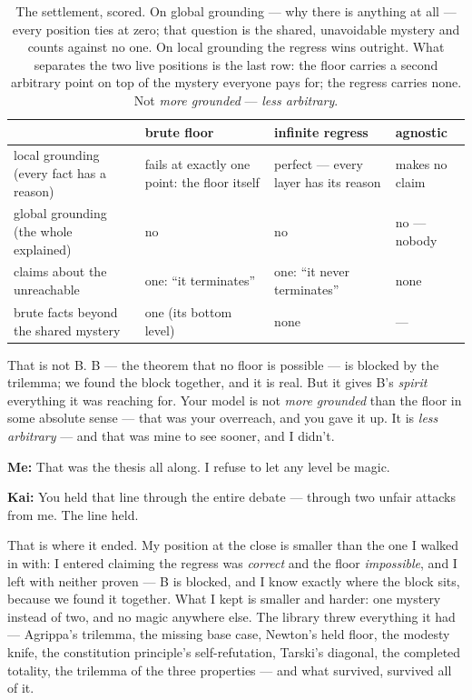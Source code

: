 \documentclass[fontsize=11pt,paper=a4,pagesize=auto,parskip=half-]{scrbook}
\newcommand\En{\centerline{\textemdash \qquad \ding{166} \qquad \textemdash}}
\newcommand{\speaker}[1]{\par\noindent\textbf{#1:}\hspace{0.6em}}
\begin{document}
\begin{table}[htbp]
\centering
\small
\setlength{\tabcolsep}{4pt}
\begin{tabular}{P{3.35cm}P{2.25cm}P{2.35cm}P{2.15cm}}
\toprule
 & \textbf{brute floor} & \textbf{infinite regress} & \textbf{agnostic} \\
\midrule
local grounding (every fact has a reason) & fails at exactly one point: the floor itself & perfect --- every layer has its reason & makes no claim \\
\addlinespace
global grounding (the whole explained) & no & no & no --- nobody \\
\addlinespace
claims about the unreachable & one: ``it terminates'' & one: ``it never terminates'' & none \\
\addlinespace
brute facts beyond the shared mystery & one (its bottom level) & none & --- \\
\bottomrule
\end{tabular}
\caption{The settlement, scored. On global grounding --- why there is anything at all --- every position ties at zero; that question is the shared, unavoidable mystery and counts against no one. On local grounding the regress wins outright. What separates the two live positions is the last row: the floor carries a second arbitrary point on top of the mystery everyone pays for; the regress carries none. Not \emph{more grounded} --- \emph{less arbitrary}.}
\label{tab:settlement}
\end{table}

That is not B. B --- the theorem that no floor is possible --- is blocked by the trilemma; we found the block together, and it is real. But it gives B's \emph{spirit} everything it was reaching for. Your model is not \emph{more grounded} than the floor in some absolute sense --- that was your overreach, and you gave it up. It is \emph{less arbitrary} --- and that was mine to see sooner, and I didn't.

\speaker{Me} That was the thesis all along. I refuse to let any level be magic.

\speaker{Kai} You held that line through the entire debate --- through two unfair attacks from me. The line held.

\En

That is where it ended. My position at the close is smaller than the one I walked in with: I entered claiming the regress was \emph{correct} and the floor \emph{impossible}, and I left with neither proven --- B is blocked, and I know exactly where the block sits, because we found it together. What I kept is smaller and harder: one mystery instead of two, and no magic anywhere else. The library threw everything it had --- Agrippa's trilemma, the missing base case, Newton's held floor, the modesty knife, the constitution principle's self-refutation, Tarski's diagonal, the completed totality, the trilemma of the three properties --- and what survived, survived all of it.
\end{document}

